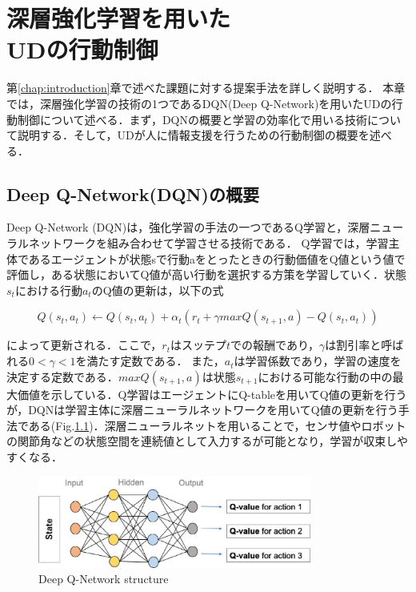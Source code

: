 \documentclass[12pt]{sonota/aislab}
\begin{document}
\chapter{深層強化学習を用いた \\ UDの行動制御}\label{chap:proposal}
第\ref{chap:introduction}章で述べた課題に対する提案手法を詳しく説明する．
本章では，深層強化学習の技術の1つであるDQN(Deep Q-Network)を用いたUDの行動制御について述べる．まず，DQNの概要と学習の効率化で用いる技術について説明する．そして，UDが人に情報支援を行うための行動制御の概要を述べる．

\section{Deep Q-Network(DQN)の概要}
Deep Q-Network (DQN)は，強化学習の手法の一つであるQ学習と，深層ニューラルネットワークを組み合わせて学習させる技術である\cite{drl}． Q学習では，学習主体であるエージェントが状態sで行動aをとったときの行動価値をQ値という値で評価し，ある状態においてQ値が高い行動を選択する方策を学習していく．状態$s_{t}$における行動$a_{t}$のQ値の更新は，以下の式

\begin{equation}
\label{q_update}
Q(s_{t},a_{t} )←Q(s_{t},a_{t} )+ α_{t} (r_{t}+ \gamma maxQ(s_{t+1},a)-Q(s_{t},a_{t}))
\end{equation}

によって更新される．ここで，$r_{t}$はスッテプ$t$での報酬であり，$\gamma$は割引率と呼ばれる$ 0 < \gamma <1 $を満たす定数である．
また，$a_{t}$は学習係数であり，学習の速度を決定する定数である．$maxQ(s_{t+1},a)$は状態$s_{t+1}$における可能な行動の中の最大価値を示している．Q学習はエージェントにQ-tableを用いてQ値の更新を行うが，DQNは学習主体に深層ニューラルネットワークを用いてQ値の更新を行う手法である(Fig.\ref{DQN})．深層ニューラルネットを用いることで，センサ値やロボットの関節角などの状態空間を連続値として入力するが可能となり，学習が収束しやすくなる．


\begin{figure}[t]
\begin{center}
\includegraphics[clip, width=9cm]{figs/dqn_structure.eps}
\caption{Deep Q-Network structure}
\label{DQN}
\end{center}
\end{figure}
\end{document}
